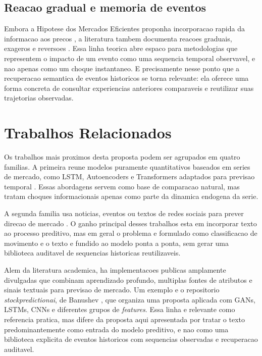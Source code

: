 \documentclass[12pt]{article}
\begin{document}
\subsection{Reacao gradual e memoria de eventos}

Embora a Hipotese dos Mercados Eficientes proponha incorporacao rapida da informacao aos precos \cite{Fama:1970}, a literatura tambem documenta reacoes graduais, exageros e reversoes \cite{Cutler:1989, Barberis:1998, Hong:1999}. Essa linha teorica abre espaco para metodologias que representem o impacto de um evento como uma sequencia temporal observavel, e nao apenas como um choque instantaneo. E precisamente nesse ponto que a recuperacao semantica de eventos historicos se torna relevante: ela oferece uma forma concreta de consultar experiencias anteriores comparaveis e reutilizar suas trajetorias observadas.

\section{Trabalhos Relacionados}

Os trabalhos mais proximos desta proposta podem ser agrupados em quatro familias. A primeira reune modelos puramente quantitativos baseados em series de mercado, como LSTM, Autoencoders e Transformers adaptados para previsao temporal \cite{Fischer:2018, Bao:2017, Lim:2021}. Essas abordagens servem como base de comparacao natural, mas tratam choques informacionais apenas como parte da dinamica endogena da serie.

A segunda familia usa noticias, eventos ou textos de redes sociais para prever direcao de mercado \cite{Ding:2014, Ding:2015, Xu:2018, Sawhney:2020}. O ganho principal desses trabalhos esta em incorporar texto ao processo preditivo, mas em geral o problema e formulado como classificacao de movimento e o texto e fundido ao modelo ponta a ponta, sem gerar uma biblioteca auditavel de sequencias historicas reutilizaveis.

Alem da literatura academica, ha implementacoes publicas amplamente divulgadas que combinam aprendizado profundo, multiplas fontes de atributos e sinais textuais para previsao de mercado. Um exemplo e o repositorio \textit{stockpredictionai}, de Banushev \cite{Banushev:2019}, que organiza uma proposta aplicada com GANs, LSTMs, CNNs e diferentes grupos de \textit{features}. Essa linha e relevante como referencia pratica, mas difere da proposta aqui apresentada por tratar o texto predominantemente como entrada do modelo preditivo, e nao como uma biblioteca explicita de eventos historicos com sequencias observadas e recuperacao auditavel.
\end{document}
